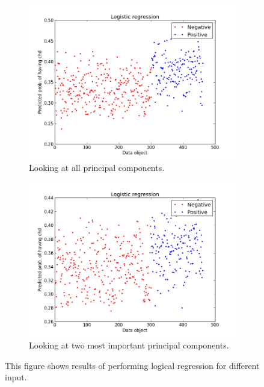 \begin{figure}[H]
	\begin{subfigure}[b]{0.5\textwidth}
	\includegraphics[scale=0.25]{pictures/logisticregressionXPC.png}
	\caption{Looking at all principal components.}
	\label{logicalRegressionResultXPA}
	\end{subfigure}
	\begin{subfigure}[b]{0.5\textwidth}
	\includegraphics[scale=0.25]{pictures/logisticregressionX2PC.png}
	\caption{Looking at two most important principal components.}
	\label{logicalRegressionResultX2PA}
	\end{subfigure}
\caption{This figure shows results of performing logical regression for different input.}
\label{logicalRegressionResults}
\vspace{-0.4cm}
\end{figure}
